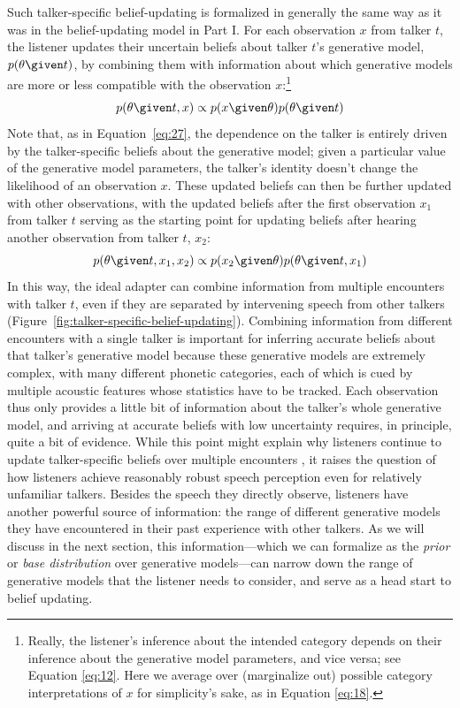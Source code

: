 Such talker-specific belief-updating is formalized in generally the same way as it was in the belief-updating model in Part I.  For each observation $x$ from talker $t$, the listener updates their uncertain beliefs about talker $t$'s generative model, $p(\theta \given t)$, by combining them with information about which generative models are more or less compatible with the observation $x$:\footnote{Really, the listener's inference about the intended category depends on their inference about the generative model parameters, and vice versa; see Equation \eqref{eq:12}.  Here we average over (marginalize out) possible category interpretations of $x$ for simplicity's sake, as in Equation \eqref{eq:18}.}
\begin{equation}
  \label{eq:28}
  p(\theta \given t, x) \propto p(x \given \theta) p(\theta \given t)
\end{equation}
Note that, as in Equation~\eqref{eq:27}, the dependence on the talker is entirely driven by the talker-specific beliefs about the generative model; given a particular value of the generative model parameters, the talker's identity doesn't change the likelihood of an observation $x$.
These updated beliefs can then be further updated with other observations, with the updated beliefs after the first observation $x_1$ from talker $t$ serving as the starting point for updating beliefs after hearing another observation from talker $t$, $x_2$: 
\begin{equation}
  \label{eq:29}
  p(\theta \given t, x_1, x_2) \propto p(x_2 \given \theta) p(\theta \given t, x_1)
\end{equation}
In this way, the ideal adapter can combine information from multiple encounters with talker $t$, even if they are separated by intervening speech from other talkers (Figure~\ref{fig:talker-specific-belief-updating}).  Combining information from different encounters with a single talker is important for inferring accurate beliefs about that talker's generative model because these generative models are extremely complex, with many different phonetic categories, each of which is cued by multiple acoustic features whose statistics have to be tracked.  Each observation thus only provides a little bit of information about the talker's whole generative model, and arriving at accurate beliefs with low uncertainty requires, in principle, quite a bit of evidence.  While this point might explain why listeners continue to update talker-specific beliefs over multiple encounters \cite<preliminary evidence for which is provided by>{Munson2011}, it raises the question of how listeners achieve reasonably robust speech perception even for relatively unfamiliar talkers.  Besides the speech they directly observe, listeners have another powerful source of information: the range of different generative models they have encountered in their past experience with other talkers.  As we will discuss in the next section, this information---which we can formalize as the \emph{prior} or \emph{base distribution} over generative models---can narrow down the range of generative models that the listener needs to consider, and serve as a head start to belief updating.

